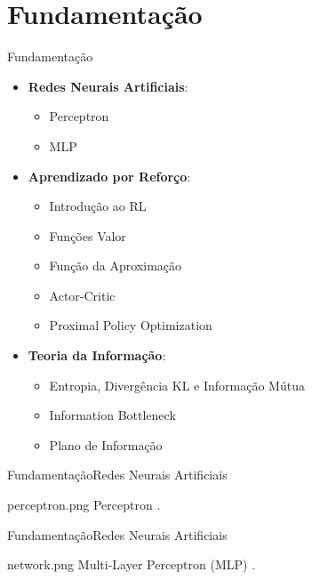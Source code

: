 \documentclass[
11pt,notheorems,hyperref={pdfauthor=Autor}
]{beamer}
\begin{document}
\section{Fundamentação}
\begin{frame}{Fundamentação}
\pause
    \begin{itemize}
    \item \textbf{Redes Neurais Artificiais}: \pause
        \begin{itemize}
            \item Perceptron\pause
            \item MLP\pause
        \end{itemize} 
    \item \textbf{Aprendizado por Reforço}:\pause
    \begin{itemize}
        \item Introdução ao RL\pause
        \item Funções Valor\pause
        \item Função da Aproximação\pause
        \item Actor-Critic\pause
        \item Proximal Policy Optimization\pause
    \end{itemize}
    
    \item \textbf{Teoria da Informação}: \pause
    \begin{itemize}
        \item Entropia, Divergência KL e Informação Mútua \pause
        \item Information Bottleneck \pause
        \item Plano de Informação
    \end{itemize} 
    
\end{itemize}
\end{frame}

\begin{frame}{Fundamentação}{Redes Neurais Artificiais}
    \pause
    \centering
    \begin{minipage}{0.7\textwidth}
        \FigureWithFallbackCaption
        {perceptron.png}
        {Perceptron \cite{haykin_neural_2009}.}
    \end{minipage}
\end{frame}

\begin{frame}{Fundamentação}{Redes Neurais Artificiais}
    \pause
    \centering
    \begin{minipage}{0.7\textwidth}
        \FigureWithFallbackCaption
        {network.png}
        {Multi-Layer Perceptron (MLP) \cite{haykin_neural_2009}.}
    \end{minipage}
\end{frame}
\end{document}
